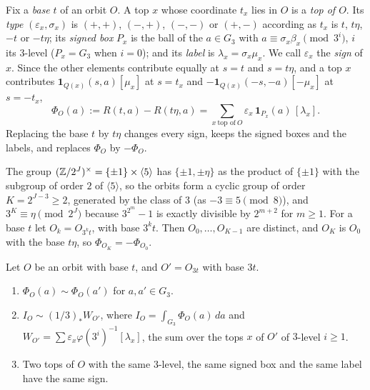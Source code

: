 Fix a \emph{base} $t$ of an orbit $O$. A top $x$ whose coordinate $t_{x}$
lies in $O$ is a \emph{top of $O$}. Its \emph{type} $(\varepsilon_{x},
\sigma_{x})$ is $(+,+)$, $(-,+)$, $(-,-)$ or $(+,-)$ according as $t_{x}$ is
$t$, $t\eta$, $-t$ or $-t\eta$; its \emph{signed box} $P_{x}$ is the ball of
the $a\in G_{3}$ with $a\equiv\sigma_{x}\beta_{x}\pmod{3^{i}}$, $i$ its
$3$-level ($P_{x}=G_{3}$ when $i=0$); and its \emph{label} is
$\lambda_{x}=\sigma_{x}\mu_{x}$. We call $\varepsilon_{x}$ the \emph{sign} of
$x$. Since the other elements contribute equally at $s=t$ and $s=t\eta$, and a
top $x$ contributes $\mathbf 1_{Q(x)}(s,a)[\mu_{x}]$ at $s=t_{x}$ and
$-\mathbf 1_{Q(x)}(-s,-a)[-\mu_{x}]$ at $s=-t_{x}$,
\begin{equation}\label{eq:PhiO}
  \Phi_{O}(a):=R(t,a)-R(t\eta,a)=\sum_{x\ \text{top of}\ O}
  \varepsilon_{x}\,\mathbf 1_{P_{x}}(a)\,[\lambda_{x}].
\end{equation}
Replacing the base $t$ by $t\eta$ changes every sign, keeps the signed boxes
and the labels, and replaces $\Phi_{O}$ by $-\Phi_{O}$.

The group $(\mathbb{Z}/2^{J})^{\times}=\{\pm1\}\times\langle5\rangle$ has
$\{\pm1,\pm\eta\}$ as the product of $\{\pm1\}$ with the subgroup of order
$2$ of $\langle5\rangle$, so the orbits form a cyclic group of order
$K=2^{J-3}\ge2$, generated by the class of $3$ (as $-3\equiv5\pmod8$), and
$3^{K}\equiv\eta\pmod{2^{J}}$ because $3^{2^{m}}-1$ is exactly divisible by
$2^{m+2}$ for $m\ge1$. For a base $t$ let $O_{k}=O_{3^{k}t}$, with base
$3^{k}t$. Then $O_{0},\dots,O_{K-1}$ are distinct, and $O_{K}$ is $O_{0}$
with the base $t\eta$, so $\Phi_{O_{K}}=-\Phi_{O_{0}}$.

\begin{lemma}\label{lem:orbit}
Let $O$ be an orbit with base $t$, and $O'=O_{3t}$ with base $3t$.
\begin{enumerate}[label=\textup{(\alph*)}]
\item $\Phi_{O}(a)\sim\Phi_{O}(a')$ for $a,a'\in G_{3}$.
\item $I_{O}\sim(1/3)_{*}W_{O'}$, where $I_{O}=\int_{G_{3}}\Phi_{O}(a)\,da$
and $W_{O'}=\sum\varepsilon_{x}\varphi(3^{i})^{-1}[\lambda_{x}]$, the sum over
the tops $x$ of $O'$ of $3$-level $i\ge1$.
\item Two tops of $O$ with the same $3$-level, the same signed box and the
same label have the same sign.
\end{enumerate}
\end{lemma}


